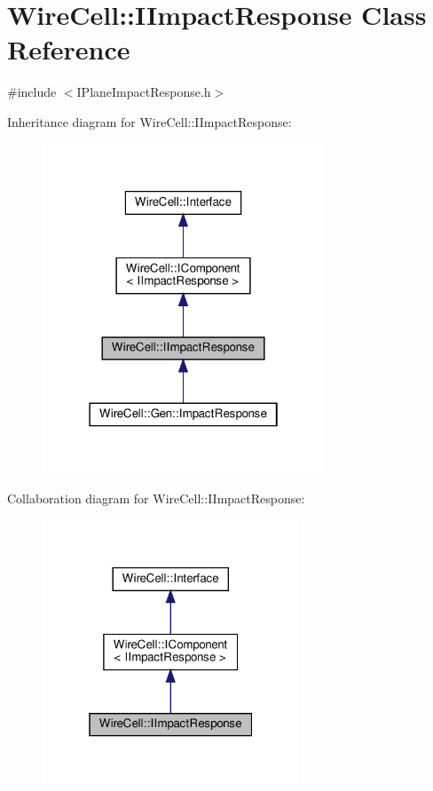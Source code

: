 \hypertarget{class_wire_cell_1_1_i_impact_response}{}\section{Wire\+Cell\+:\+:I\+Impact\+Response Class Reference}
\label{class_wire_cell_1_1_i_impact_response}


{\ttfamily \#include $<$I\+Plane\+Impact\+Response.\+h$>$}



Inheritance diagram for Wire\+Cell\+:\+:I\+Impact\+Response\+:
\nopagebreak
\begin{figure}[H]
\begin{center}
\leavevmode
\includegraphics[width=238pt]{class_wire_cell_1_1_i_impact_response__inherit__graph}
\end{center}
\end{figure}


Collaboration diagram for Wire\+Cell\+:\+:I\+Impact\+Response\+:
\nopagebreak
\begin{figure}[H]
\begin{center}
\leavevmode
\includegraphics[width=217pt]{class_wire_cell_1_1_i_impact_response__coll__graph}
\end{center}
\end{figure}

